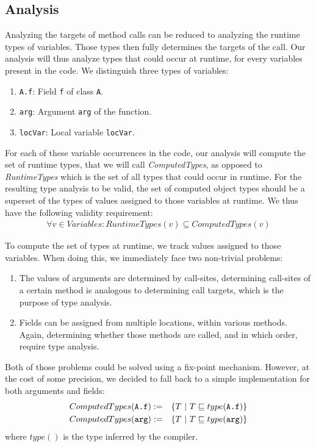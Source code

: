\subsection{Analysis}
Analyzing the targets of method calls can be reduced to analyzing the runtime
types of variables. Those types then fully determines the targets of the call.
Our analysis will thus analyze types that could occur at runtime, for every
variables present in the code. We distinguish three types of variables:
\begin{enumerate}
    \item \lstinline{A.f}: Field \lstinline{f} of class \lstinline{A}.
    \item \lstinline{arg}: Argument \lstinline{arg} of the function.
    \item \lstinline{locVar}: Local variable \lstinline{locVar}.
\end{enumerate}

For each of these variable occurrences in the code, our analysis will compute
the set of runtime types, that we will call \emph{ComputedTypes}, as opposed to
\emph{RuntimeTypes} which is the set of all types that could occur in runtime.
For the resulting type analysis to be valid, the set of computed object types
should be a superset of the types of values assigned to those variables at
runtime.  We thus have the following validity requirement:
\begin{eqnarray*}
    \forall v \in Variables: RuntimeTypes(v) \subseteq ComputedTypes(v)
\end{eqnarray*}

To compute the set of types at runtime, we track values assigned to those
variables. When doing this, we immediately face two non-trivial problems:
\begin{enumerate}
    \item The values of arguments are determined by call-sites, determining
    call-sites of a certain method is analogous to determining call targets,
    which is the purpose of type analysis.

    \item Fields can be assigned from multiple locations, within various
    methods. Again, determining whether those methods are
    called, and in which order, require type analysis.
\end{enumerate}

Both of those problems could be solved using a fix-point mechanism. However, at
the cost of some precision, we decided to fall back to a simple implementation
for both arguments and fields:
\begin{eqnarray*}
    ComputedTypes(\verb/A.f/) &:=& \{ T ~|~ T \subtypeeq type(\verb/A.f/) \} \\
    ComputedTypes(\verb/arg/) &:=& \{ T ~|~ T \subtypeeq type(\verb/arg/) \} \\
\end{eqnarray*}
where $type()$ is the type inferred by the compiler.

